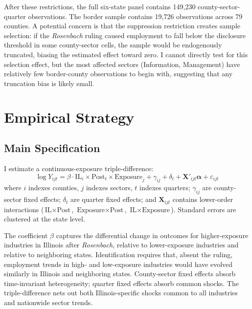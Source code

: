 \documentclass[12pt]{article}
\begin{document}
After these restrictions, the full six-state panel contains 149,230 county-sector-quarter observations. The border sample contains 19,726 observations across 79 counties. A potential concern is that the suppression restriction creates sample selection: if the \textit{Rosenbach} ruling caused employment to fall below the disclosure threshold in some county-sector cells, the sample would be endogenously truncated, biasing the estimated effect toward zero. I cannot directly test for this selection effect, but the most affected sectors (Information, Management) have relatively few border-county observations to begin with, suggesting that any truncation bias is likely small.

\section{Empirical Strategy}
\label{sec:strategy}

\subsection{Main Specification}

I estimate a continuous-exposure triple-difference:
\begin{equation}
\log Y_{ijt} = \beta \cdot \text{IL}_i \times \text{Post}_t \times \text{Exposure}_j + \gamma_{ij} + \delta_t + \mathbf{X}'_{ijt}\boldsymbol{\alpha} + \varepsilon_{ijt}
\label{eq:main}
\end{equation}
where $i$ indexes counties, $j$ indexes sectors, $t$ indexes quarters; $\gamma_{ij}$ are county-sector fixed effects; $\delta_t$ are quarter fixed effects; and $\mathbf{X}_{ijt}$ contains lower-order interactions ($\text{IL} \times \text{Post}$, $\text{Exposure} \times \text{Post}$, $\text{IL} \times \text{Exposure}$). Standard errors are clustered at the state level.

The coefficient $\beta$ captures the differential change in outcomes for higher-exposure industries in Illinois after \textit{Rosenbach}, relative to lower-exposure industries and relative to neighboring states. Identification requires that, absent the ruling, employment trends in high- and low-exposure industries would have evolved similarly in Illinois and neighboring states. County-sector fixed effects absorb time-invariant heterogeneity; quarter fixed effects absorb common shocks. The triple-difference nets out both Illinois-specific shocks common to all industries and nationwide sector trends.
\end{document}
